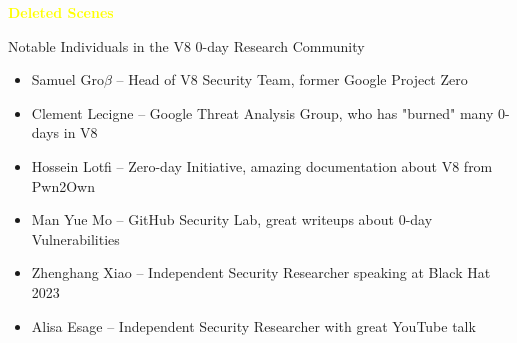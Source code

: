 \begin{frame}{}
    \centering
        \Huge\bfseries
    \textcolor{yellow}{Deleted Scenes}
\end{frame}

\begin{frame}{Notable Individuals in the V8 0-day Research Community}
    \begin{itemize}
        \item Samuel Gro$\beta$ -- Head of V8 Security Team, former Google Project Zero
        \item Clement Lecigne -- Google Threat Analysis Group, who has "burned" many 0-days in V8 
        \item Hossein Lotfi -- Zero-day Initiative, amazing documentation about V8 from Pwn2Own 
        \item Man Yue Mo -- GitHub Security Lab, great writeups about 0-day Vulnerabilities 
        \item Zhenghang Xiao -- Independent Security Researcher speaking at Black Hat 2023
        \item Alisa Esage -- Independent Security Researcher with great YouTube talk
    \end{itemize}
    \break
    \href{https://phrack.org/issues/70/3.html}{\color{pink}{Samuel Grob's phrack.org article on V8 exploitation}}
    \break
    \href{https://www.youtube.com/watch?v=WouAptHlyC4}{\color{pink}{Alisa Esage's Modern Attacks on Google Chrome YouTube talk}}
\end{frame}

